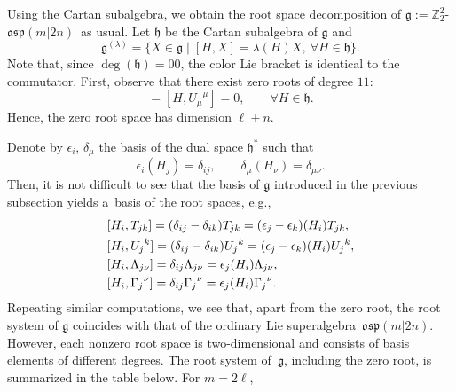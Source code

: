 \documentclass[10pt,a4paper]{amsart}
\numberwithin{equation}{section}
\theoremstyle{definition}
\def\nn{\notag}
\def\Z2{\mathbb{Z}_2^2}
\def\g{\mathfrak{g}}
\def\osp{\mathfrak{osp}}
\def\Zosp{$\Z2$-$\osp(m|2n)$}
\begin{document}
Using the Cartan subalgebra, we obtain the root space decomposition of $\g := $\Zosp\ as usual. Let $ \mathfrak{h} $ be the Cartan subalgebra of $\g$ and
\begin{equation*}
	\g^{(\lambda)} = \{ X \in \g \mid [H, X] = \lambda(H) X, \ \forall H \in \mathfrak{h} \}.
\end{equation*}
Note that, since $\deg(\mathfrak{h}) = 00$, the color Lie bracket is identical to the commutator.
First, observe that there exist zero roots of degree $11$:{\samepage
\begin{equation*}
	[H, {U_i}^i] = [H, {U_{\mu}}^{\mu}] = 0, \qquad \forall H \in \mathfrak{h}.
\end{equation*}
Hence, the zero root space has dimension $\ell+n$.}

Denote by $ \epsilon_i$, $\delta_{\mu}$ the basis of the dual space $\mathfrak{h}^*$ such that
\begin{equation*}
	\epsilon_i(H_j) = \delta_{ij}, \qquad
	\delta_{\mu}(H_{\nu}) = \delta_{\mu\nu}.
\end{equation*}
Then, it is not difficult to see that the basis of $\g$ introduced in the previous subsection yields a~basis of the root spaces, e.g.,
\begin{align*}
	&[H_i, T_{jk}]= (\delta_{ij} - \delta_{ik} ) T_{jk} = (\epsilon_j - \epsilon_k)(H_i) T_{jk},
	\nn \\
	&[H_i, {U_j}^k]=(\delta_{ij} - \delta_{ik} ) {U_j}^k = (\epsilon_j - \epsilon_k)(H_i) {U_j}^k,
	\nn \\
	&[H_i, \Lambda_{j\nu}]= \delta_{ij} \Lambda_{j\nu} = \epsilon_j(H_i) \Lambda_{j\nu},
	\nn \\
	&[H_i, {\Gamma_j}^{\nu}]= \delta_{ij}{\Gamma_j}^{\nu} = \epsilon_j(H_i) {\Gamma_j}^{\nu}.
\end{align*}
Repeating similar computations, we see that, apart from the zero root, the root system of $\g$ coincides with that of the ordinary Lie superalgebra~$\osp(m|2n)$.
However, each nonzero root space is two-dimensional and consists of basis elements of different degrees.
The root system of~$\g$, including the zero root, is summarized in the table below. For $m = 2\ell$,
\end{document}
